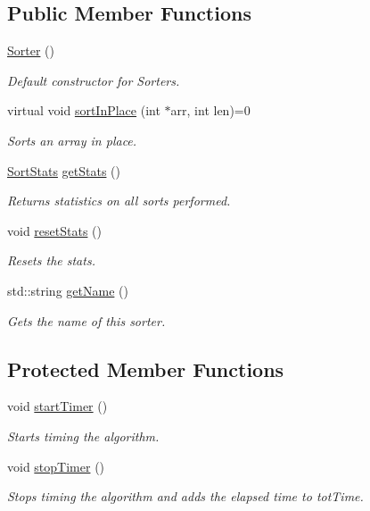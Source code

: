 \subsection*{Public Member Functions}
\begin{DoxyCompactItemize}
\item 
\hyperlink{class_sorter_a0b2a0bc2bae60db1115788f49f988859}{Sorter} ()
\begin{DoxyCompactList}\small\item\em Default constructor for Sorters. \end{DoxyCompactList}\item 
virtual void \hyperlink{class_sorter_a946276dc986c9f017e84986c74e7cf18}{sort\+In\+Place} (int $\ast$arr, int len)=0
\begin{DoxyCompactList}\small\item\em Sorts an array in place. \end{DoxyCompactList}\item 
\hyperlink{struct_sort_stats}{Sort\+Stats} \hyperlink{class_sorter_af864ce19b5f14a410ab55c1af6b4e3a5}{get\+Stats} ()
\begin{DoxyCompactList}\small\item\em Returns statistics on all sorts performed. \end{DoxyCompactList}\item 
void \hyperlink{class_sorter_a085f06b5b3200a426c05fab3eca30dfe}{reset\+Stats} ()
\begin{DoxyCompactList}\small\item\em Resets the stats. \end{DoxyCompactList}\item 
std\+::string \hyperlink{class_sorter_aa7596dcc44254c88e2544708adff0de0}{get\+Name} ()
\begin{DoxyCompactList}\small\item\em Gets the name of this sorter. \end{DoxyCompactList}\end{DoxyCompactItemize}
\subsection*{Protected Member Functions}
\begin{DoxyCompactItemize}
\item 
void \hyperlink{class_sorter_a706bb59cd4957fe8e7b2eb46f1a09092}{start\+Timer} ()
\begin{DoxyCompactList}\small\item\em Starts timing the algorithm. \end{DoxyCompactList}\item 
void \hyperlink{class_sorter_a2aff740358afb37276666168cf059f62}{stop\+Timer} ()
\begin{DoxyCompactList}\small\item\em Stops timing the algorithm and adds the elapsed time to tot\+Time. \end{DoxyCompactList}\end{DoxyCompactItemize}
